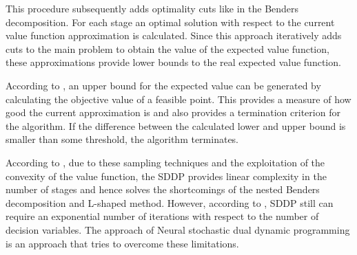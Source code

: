 This procedure subsequently adds optimality cuts like in the Benders decomposition.
For each stage an optimal solution with respect to the current value function approximation is calculated.
Since this approach iteratively adds cuts to the main problem to obtain the value of the expected value function, these approximations provide lower bounds to the real expected value function.

According to \cite{PereiraPinto1991}, an upper bound for the expected value can be generated by calculating the objective value of a feasible point.
This provides a measure of how good the current approximation is and also provides a termination criterion for the algorithm.
If the difference between the calculated lower and upper bound is smaller than some threshold, the algorithm terminates.

According to \cite{SDDP_Solver_Paper}, due to these sampling techniques and the exploitation of the convexity of the value function, the SDDP provides linear complexity in the number of stages and hence solves the shortcomings of the nested Benders decomposition and L-shaped method. 
However, according to \cite{NSDDP}, SDDP still can require an exponential number of iterations with respect to the number of decision variables.
The approach of Neural stochastic dual dynamic programming is an approach that tries to overcome these limitations.
